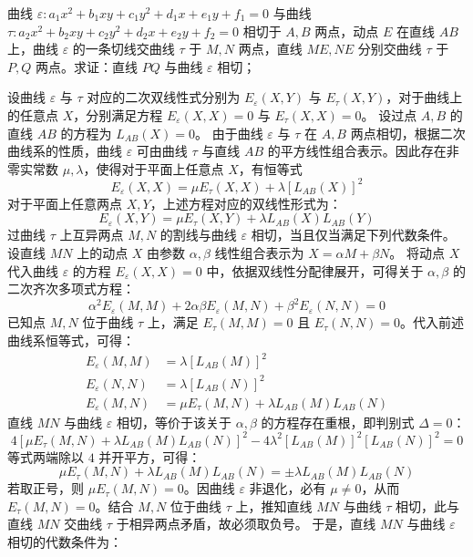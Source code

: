 \begin{example}
曲线 $\varepsilon: a_1x^2 + b_1xy + c_1y^2 + d_1x + e_1y + f_1 = 0$ 与曲线 $\tau: a_2x^2 + b_2xy + c_2y^2 + d_2x + e_2y + f_2 = 0$ 相切于 $A,B$ 两点，动点 $E$ 在直线 $AB$ 上，曲线 $\varepsilon$ 的一条切线交曲线 $\tau$ 于 $M,N$ 两点，直线 $ME,NE$ 分别交曲线 $\tau$ 于 $P,Q$ 两点。求证：直线 $PQ$ 与曲线 $\varepsilon$ 相切；
\end{example}
\begin{solution}
设曲线 $\varepsilon$ 与 $\tau$ 对应的二次双线性式分别为 $E_\varepsilon(X,Y)$ 与 $E_\tau(X,Y)$，对于曲线上的任意点 $X$，分别满足方程 $E_\varepsilon(X,X) = 0$ 与 $E_\tau(X,X) = 0$。
设过点 $A, B$ 的直线 $AB$ 的方程为 $L_{AB}(X) = 0$。
由于曲线 $\varepsilon$ 与 $\tau$ 在 $A, B$ 两点相切，根据二次曲线系的性质，曲线 $\varepsilon$ 可由曲线 $\tau$ 与直线 $AB$ 的平方线性组合表示。因此存在非零实常数 $\mu, \lambda$，使得对于平面上任意点 $X$，有恒等式
\[ E_\varepsilon(X,X) = \mu E_\tau(X,X) + \lambda [L_{AB}(X)]^2 \]
对于平面上任意两点 $X, Y$，上述方程对应的双线性形式为：
\[ E_\varepsilon(X,Y) = \mu E_\tau(X,Y) + \lambda L_{AB}(X)L_{AB}(Y) \]
过曲线 $\tau$ 上互异两点 $M,N$ 的割线与曲线 $\varepsilon$ 相切，当且仅当满足下列代数条件。
设直线 $MN$ 上的动点 $X$ 由参数 $\alpha, \beta$ 线性组合表示为 $X = \alpha M + \beta N$。
将动点 $X$ 代入曲线 $\varepsilon$ 的方程 $E_\varepsilon(X,X) = 0$ 中，依据双线性分配律展开，可得关于 $\alpha, \beta$ 的二次齐次多项式方程：
\[ \alpha^2 E_\varepsilon(M,M) + 2\alpha\beta E_\varepsilon(M,N) + \beta^2 E_\varepsilon(N,N) = 0 \]
已知点 $M, N$ 位于曲线 $\tau$ 上，满足 $E_\tau(M,M) = 0$ 且 $E_\tau(N,N) = 0$。代入前述曲线系恒等式，可得：
\begin{align*}
E_\varepsilon(M,M) &= \lambda [L_{AB}(M)]^2 \\
E_\varepsilon(N,N) &= \lambda [L_{AB}(N)]^2 \\
E_\varepsilon(M,N) &= \mu E_\tau(M,N) + \lambda L_{AB}(M)L_{AB}(N)
\end{align*}
直线 $MN$ 与曲线 $\varepsilon$ 相切，等价于该关于 $\alpha, \beta$ 的方程存在重根，即判别式 $\Delta = 0$：
\[ 4[\mu E_\tau(M,N) + \lambda L_{AB}(M)L_{AB}(N)]^2 - 4\lambda^2 [L_{AB}(M)]^2 [L_{AB}(N)]^2 = 0 \]
等式两端除以 $4$ 并开平方，可得：
\[ \mu E_\tau(M,N) + \lambda L_{AB}(M)L_{AB}(N) = \pm \lambda L_{AB}(M)L_{AB}(N) \]
若取正号，则 $\mu E_\tau(M,N) = 0$。因曲线 $\varepsilon$ 非退化，必有 $\mu \neq 0$，从而 $E_\tau(M,N) = 0$。结合 $M,N$ 位于曲线 $\tau$ 上，推知直线 $MN$ 与曲线 $\tau$ 相切，此与直线 $MN$ 交曲线 $\tau$ 于相异两点矛盾，故必须取负号。
于是，直线 $MN$ 与曲线 $\varepsilon$ 相切的代数条件为：

\end{solution}
